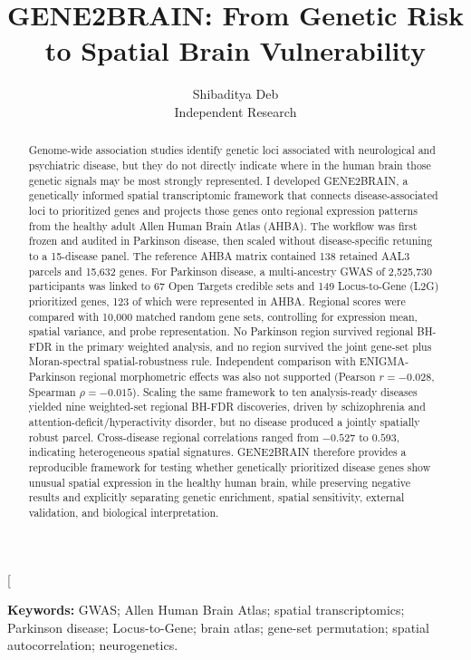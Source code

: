 \documentclass[10pt,twocolumn]{article}
\title{\textbf{GENE2BRAIN: From Genetic Risk to Spatial Brain Vulnerability}}
\author{Shibaditya Deb\\
\small Independent Research}
\date{}
\begin{document}
\twocolumn[
\maketitle

\begin{abstract}
Genome-wide association studies identify genetic loci associated with neurological and psychiatric disease, but they do not directly indicate where in the human brain those genetic signals may be most strongly represented. I developed GENE2BRAIN, a genetically informed spatial transcriptomic framework that connects disease-associated loci to prioritized genes and projects those genes onto regional expression patterns from the healthy adult Allen Human Brain Atlas (AHBA). The workflow was first frozen and audited in Parkinson disease, then scaled without disease-specific retuning to a 15-disease panel. The reference AHBA matrix contained 138 retained AAL3 parcels and 15,632 genes. For Parkinson disease, a multi-ancestry GWAS of 2,525,730 participants was linked to 67 Open Targets credible sets and 149 Locus-to-Gene (L2G) prioritized genes, 123 of which were represented in AHBA. Regional scores were compared with 10,000 matched random gene sets, controlling for expression mean, spatial variance, and probe representation. No Parkinson region survived regional BH-FDR in the primary weighted analysis, and no region survived the joint gene-set plus Moran-spectral spatial-robustness rule. Independent comparison with ENIGMA-Parkinson regional morphometric effects was also not supported (Pearson $r=-0.028$, Spearman $\rho=-0.015$). Scaling the same framework to ten analysis-ready diseases yielded nine weighted-set regional BH-FDR discoveries, driven by schizophrenia and attention-deficit/hyperactivity disorder, but no disease produced a jointly spatially robust parcel. Cross-disease regional correlations ranged from $-0.527$ to $0.593$, indicating heterogeneous spatial signatures. GENE2BRAIN therefore provides a reproducible framework for testing whether genetically prioritized disease genes show unusual spatial expression in the healthy human brain, while preserving negative results and explicitly separating genetic enrichment, spatial sensitivity, external validation, and biological interpretation.
\end{abstract}

\noindent\textbf{Keywords:} GWAS; Allen Human Brain Atlas; spatial transcriptomics; Parkinson disease; Locus-to-Gene; brain atlas; gene-set permutation; spatial autocorrelation; neurogenetics.
\end{document}
